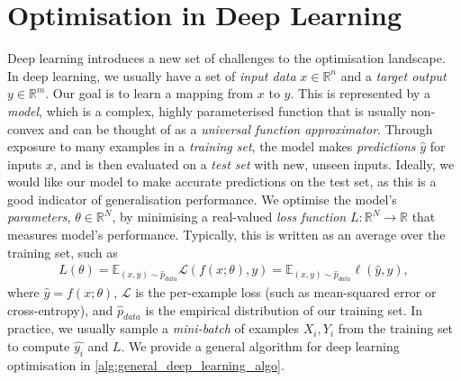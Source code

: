 
\section{Optimisation in Deep Learning}
\label{sec:optimisation_in_deep_learning}

Deep learning introduces a new set of challenges to the optimisation landscape. In deep learning, we usually have a set of \textit{input data} $x \in \mathbb{R}^n$ and a \textit{target output} $y \in \mathbb{R}^m$. Our goal is to learn a mapping from $x$ to $y$. This is represented by a \textit{model}, which is a complex, highly parameterised function that is usually non-convex and can be thought of as a \textit{universal function approximator}. Through exposure to many examples in a \textit{training set}, the model makes \textit{predictions} $\hat{y}$ for inputs $x$, and is then evaluated on a \textit{test set} with new, unseen inputs. Ideally, we would like our model to make accurate predictions on the test set, as this is a good indicator of generalisation performance. We optimise the model's \textit{parameters}, $\theta \in \mathbb{R}^N$, by minimising a real-valued \textit{loss function} $L: \mathbb{R}^N \to \mathbb{R}$ that measures model's performance. Typically, this is written as an average over the training set, such as
\begin{align}
    L(\theta) = \mathbb{E}_{(x, y) \sim \hat{p}_{data}} \mathcal{L}(f(x; \theta), y) = \mathbb{E}_{(x, y) \sim \hat{p}_{data}} \ell(\hat{y}, y),
\end{align}
where $\hat{y} = f(x; \theta)$, $\mathcal{L}$ is the per-example loss (such as mean-squared error or cross-entropy), and $\hat{p}_{data}$ is the empirical distribution of our training set. In practice, we usually sample a \textit{mini-batch} of examples $X_i, Y_i$ from the training set to compute $\hat{y_i}$ and $L$. We provide a general algorithm for deep learning optimisation in \cref{alg:general_deep_learning_algo}.

